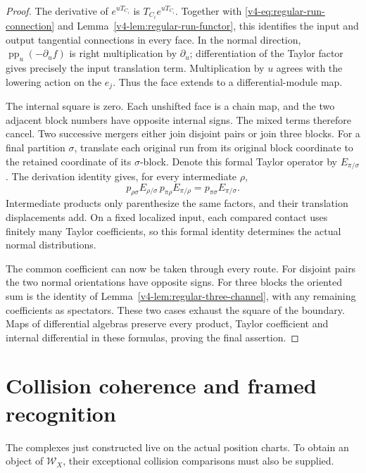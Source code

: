 \begin{proof}
The derivative of \(e^{uT_{C_i}}\) is
\(T_{C_i}e^{uT_{C_i}}\). Together with
\eqref{v4-eq:regular-run-connection} and
Lemma~\ref{v4-lem:regular-run-functor}, this identifies the
input and output tangential connections in every face.
In the normal direction,
\(\operatorname{pp}_u(-\partial_u f)\) is right
multiplication by \(\partial_u\); differentiation of the
Taylor factor gives precisely the input translation term.
Multiplication by \(u\) agrees with the lowering action
on the \(e_j\). Thus the face extends to a
differential-module map.

The internal square is zero. Each unshifted face is a chain
map, and the two adjacent block numbers have opposite
internal signs. The mixed terms therefore cancel.
Two successive mergers either join disjoint pairs or join
three blocks. For a final partition \(\sigma\), translate
each original run from its original block coordinate to
the retained coordinate of its \(\sigma\)-block. Denote
this formal Taylor operator by \(E_{\pi/\sigma}\).
The derivation identity gives, for every intermediate \(\rho\),
\[
 p_{\rho\sigma}E_{\rho/\sigma}\,
 p_{\pi\rho}E_{\pi/\rho}
       =p_{\pi\sigma}E_{\pi/\sigma}.
\]
Intermediate products only parenthesize the same factors,
and their translation displacements add. On a fixed
localized input, each compared contact uses finitely many
Taylor coefficients, so this formal identity determines
the actual normal distributions.

The common coefficient can now be taken through every
route. For disjoint pairs the two normal orientations
have opposite signs. For three blocks the oriented sum
is the identity of Lemma~\ref{v4-lem:regular-three-channel},
with any remaining coefficients as spectators. These
two cases exhaust the square of the boundary.
Maps of differential algebras preserve every product,
Taylor coefficient and internal differential in these
formulas, proving the final assertion.
\end{proof}

\section{Collision coherence and framed recognition}
\label{v4-sec:regular-recognition}

The complexes just constructed live on the actual position
charts. To obtain an object of \(\mathcal W_X\), their
exceptional collision comparisons must also be supplied.

